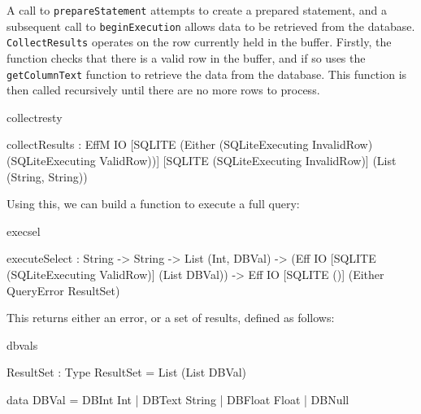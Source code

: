 A call to \texttt{prepareStatement} attempts to create a prepared statement,
and a subsequent call to \texttt{beginExecution} allows data to be retrieved
from the database.
%
\texttt{CollectResults} operates on the row currently held in the buffer.
Firstly, the function checks
that there is a valid row in the buffer, and if so uses the
\texttt{getColumnText} function to retrieve the data
from the database. This function is then called recursively until there are no
more rows to process.

\begin{SaveVerbatim}{collectresty}

collectResults :
  EffM IO [SQLITE (Either (SQLiteExecuting InvalidRow) 
                          (SQLiteExecuting ValidRow))] 
          [SQLITE (SQLiteExecuting InvalidRow)] 
          (List (String, String))
\end{SaveVerbatim}


\noindent
{}

\noindent
{}

\noindent
Using this, we can build a function to execute a full query:

\begin{SaveVerbatim}{execsel}

executeSelect : 
  String -> String -> List (Int, DBVal) -> 
  (Eff IO [SQLITE (SQLiteExecuting ValidRow)] 
               (List DBVal)) -> 
  Eff IO [SQLITE ()] (Either QueryError ResultSet)
 
\end{SaveVerbatim}

\noindent
This returns either an error, or a set of results, defined
as follows:

\begin{SaveVerbatim}{dbvals}

ResultSet : Type
ResultSet = List (List DBVal)

data DBVal = DBInt Int     | DBText String
           | DBFloat Float | DBNull

\end{SaveVerbatim}


